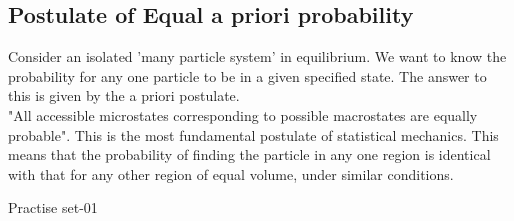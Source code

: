 \subsection{Postulate of Equal a priori probability}
Consider an isolated 'many particle system' in equilibrium. We want to know the probability for any one particle to be in a given specified state. The answer to this is given by the a priori postulate.\\
"All accessible microstates corresponding to possible macrostates are equally probable". This is the most fundamental postulate of statistical mechanics. This means that the probability of finding the particle in any one region is identical with that for any other region of equal volume, under similar conditions.\\
\newpage
\begin{abox}
	Practise set-01
\end{abox}
